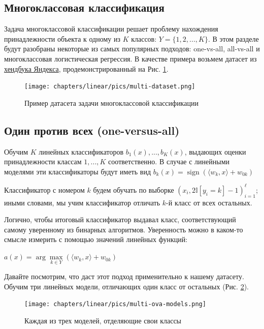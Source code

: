 \begin{itemize}
\section{Многоклассовая классификация}

Задача многоклассовой классификации решает проблему нахождения принадлежности объекта к одному из $K$ классов: $Y = \{1, 2, ..., K\}$. В этом разделе будут разобраны некоторые из самых популярных подходов: one-vs-all, all-vs-all и многоклассовая логистическая регрессия. В качестве примера возьмем датасет из \href{https://education.yandex.ru/handbook/ml/article/linear-models}{хендбука Яндекса}, продемонстрированный на Рис. \ref{fig:linear-multi-dataset}.

\begin{figure}[ht]
	\centering
	\texttt{[image: chapters/linear/pics/multi-dataset.png]}
	\caption{Пример датасета задачи многоклассовой классификации}
	\label{fig:linear-multi-dataset}
\end{figure}

\subsection{Один против всех (one-versus-all)}

Обучим $K$ линейных классификаторов $b_1(x),...,b_K(x)$, выдающих оценки принадлежности классам $1,...,K$ соответственно. В случае с линейными моделями эти классификаторы будут иметь вид $b_k(x) = \operatorname{sign}(\langle w_k, x \rangle+w_{0k})$

Классификатор с номером $k$ будем обучать по выборке $(x_i, 2 \mathbb{I}[y_i = k] -1)^\ell_{i=1} $; иными словами, мы учим классификатор отличать $k$-й класс от всех остальных.

Логично, чтобы итоговый классификатор выдавал класс, соответствующий самому уверенному из бинарных алгоритмов. Уверенность можно в каком-то смысле измерить с помощью значений линейных функций:

$ a(x)= \operatorname{arg}\max\limits_{k \in Y} (\langle w_k, x \rangle+w_{0k})$

Давайте посмотрим, что даст этот подход применительно к нашему датасету. Обучим три линейных модели, отличающих один класс от остальных (Рис. \ref{fig:linear-multi-ova-models}).

\begin{figure}[H]
	\centering
	\texttt{[image: chapters/linear/pics/multi-ova-models.png]}
	\caption{Каждая из трех моделей, отделяющие свои классы}
	\label{fig:linear-multi-ova-models}
\end{figure}


\end{itemize}
